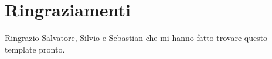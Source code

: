 \documentclass[12pt,a4paper,italian,twoside, openany]{book}
\begin{document}


\setlength{\parskip}{\bigskipamount}
\renewcommand{\baselinestretch}{1.4}\normalsize


\renewcommand{\baselinestretch}{1}\normalsize


\frontmatter 						%
\tableofcontents

\pagestyle{plain}

\renewcommand{\baselinestretch}{1.4}\normalsize

\mainmatter






\pagestyle{empty}

\chapter*{Ringraziamenti}
Ringrazio Salvatore, Silvio e Sebastian che mi hanno fatto trovare questo template pronto.


%




\nocite{*}



\cleardoublepage
\listoffigures
\listoftables

\cleardoublepage
\end{document}

